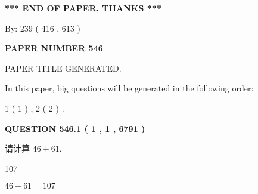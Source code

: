 \documentclass{ctexart}
\begin{document}
   
   
   
\vspace{1.0in} 
{\textbf{\large{ *** END OF PAPER, THANKS *** }}} 
   
   
\hspace{1.0in} By: 
 239 ( 416 ,  613 )
   
   
   
   
\newpage 
\setcounter{page}{ 
   546001 } 
   
   
   
   
 {\textbf{ \Large{ PAPER NUMBER  546  }}}
   
   
\vspace{0.2in}
   
   
   
   
   
   
   
   
 \vspace{0.2in}
 
 
 
 
   
   
 PAPER TITLE GENERATED.
   
   
   
\vspace{0.2in}
   
In this paper, big questions will be generated in the following order: 
   
   
   1 ( 1 )
 ,
   2 ( 2 )
 .
  
\vspace{0.2in}
  
{\textbf{\Large{QUESTION
546.1 
 ( 1 , 1 , 6791 )
}}}
  
  
 
请计算 $ %
46 +  %
61 $.
 
 
 
\noindent{}
 
 

107
 
 
\noindent{}
 
 

 
 
 
\noindent{}
 
 

$ %
46 +  %
61=   %
107$
 
\end{document}
